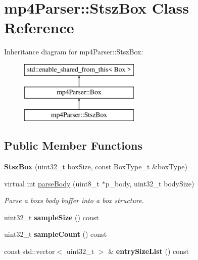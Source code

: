 \hypertarget{classmp4_parser_1_1_stsz_box}{}\section{mp4\+Parser\+::Stsz\+Box Class Reference}
\label{classmp4_parser_1_1_stsz_box}
Inheritance diagram for mp4\+Parser\+::Stsz\+Box\+:\begin{figure}[H]
\begin{center}
\leavevmode
\includegraphics[height=3.000000cm]{classmp4_parser_1_1_stsz_box}
\end{center}
\end{figure}
\subsection*{Public Member Functions}
\begin{DoxyCompactItemize}
\item 
\mbox{\label{classmp4_parser_1_1_stsz_box_afd49a610f4e29a90b45ec5bf1098670d}} 
{\bfseries Stsz\+Box} (uint32\+\_\+t box\+Size, const Box\+Type\+\_\+t \&box\+Type)
\item 
virtual int \mbox{\hyperlink{classmp4_parser_1_1_stsz_box_a65c4c42316cdc488b44cd3c15412e84a}{parse\+Body}} (uint8\+\_\+t $\ast$p\+\_\+body, uint32\+\_\+t body\+Size)
\begin{DoxyCompactList}\small\item\em Parse a box\textquotesingle{}s body buffer into a box structure. \end{DoxyCompactList}\item 
\mbox{\label{classmp4_parser_1_1_stsz_box_a1037f3a1c5971c04826885df818a50b1}} 
uint32\+\_\+t {\bfseries sample\+Size} () const
\item 
\mbox{\label{classmp4_parser_1_1_stsz_box_a7bb97ef2a13f9bb43ba1acf3a76f6b90}} 
uint32\+\_\+t {\bfseries sample\+Count} () const
\item 
\mbox{\label{classmp4_parser_1_1_stsz_box_a726d513a3f705232b3c0125c0e051180}} 
const std\+::vector$<$ uint32\+\_\+t $>$ \& {\bfseries entry\+Size\+List} () const
\end{DoxyCompactItemize}
